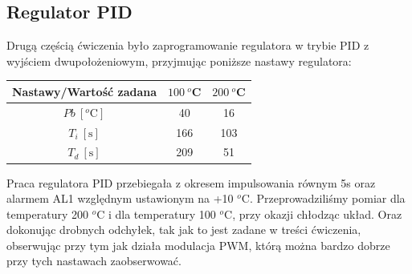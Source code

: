 \documentclass[a4paper, 12pt]{article}
\begin{document}
		\subsection{Regulator PID} 
			Drugą częścią ćwiczenia było zaprogramowanie regulatora w trybie PID z wyjściem dwupołożeniowym, przyjmując poniższe nastawy regulatora:
			\begin{center}
				\begin{tabular}{|c|c|c|}
					\hline Nastawy/Wartość zadana & $100\ ^o$C & $200\ ^o$C  \\ 
					\hline $Pb \ [^o\mathrm{C}]$ & 40  & 16  \\ 
					\hline $T_i \ [\mathrm{s}]$ & 166 & 103 \\ 
					\hline $T_d \ [\mathrm{s}]$ & 209 & 51 \\ 
					\hline 
				\end{tabular} 
			\end{center}
			Praca regulatora PID przebiegała z okresem impulsowania równym 5s oraz alarmem AL1 względnym ustawionym na +10 $^o$C.
			\newline 
			\newline
			Przeprowadziliśmy pomiar dla temperatury 200 $^o$C i dla temperatury 100 $^o$C, przy okazji chłodząc układ. Oraz dokonując drobnych odchyłek, tak jak to jest zadane w treści ćwiczenia, obserwując przy tym jak działa modulacja PWM, którą można bardzo dobrze przy tych nastawach zaobserwować.
\end{document}
